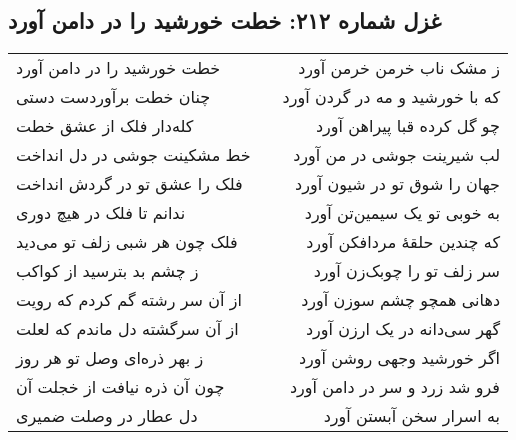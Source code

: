 \begin{center}
\section*{غزل شماره ۲۱۲: خطت خورشید را در دامن آورد}
\label{sec:212}
\begin{longtable}{l p{0.5cm} r}
خطت خورشید را در دامن آورد
&&
ز مشک ناب خرمن خرمن آورد
\\
چنان خطت برآوردست دستی
&&
که با خورشید و مه در گردن آورد
\\
کله‌دار فلک از عشق خطت
&&
چو گل کرده قبا پیراهن آورد
\\
خط مشکینت جوشی در دل انداخت
&&
لب شیرینت جوشی در من آورد
\\
فلک را عشق تو در گردش انداخت
&&
جهان را شوق تو در شیون آورد
\\
ندانم تا فلک در هیچ دوری
&&
به خوبی تو یک سیمین‌تن آورد
\\
فلک چون هر شبی زلف تو می‌دید
&&
که چندین حلقهٔ مردافکن آورد
\\
ز چشم بد بترسید از کواکب
&&
سر زلف تو را چوبک‌زن آورد
\\
از آن سر رشته گم کردم که رویت
&&
دهانی همچو چشم سوزن آورد
\\
از آن سرگشته دل ماندم که لعلت
&&
گهر سی‌دانه در یک ارزن آورد
\\
ز بهر ذره‌ای وصل تو هر روز
&&
اگر خورشید وجهی روشن آورد
\\
چون آن ذره نیافت از خجلت آن
&&
فرو شد زرد و سر در دامن آورد
\\
دل عطار در وصلت ضمیری
&&
به اسرار سخن آبستن آورد
\\
\end{longtable}
\end{center}
